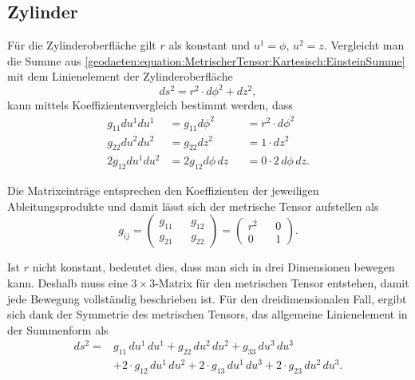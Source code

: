 %
%
%
%
\subsection{Zylinder\label{geodaeten:section:MetrischerTensor:Zylinder}}

Für die Zylinderoberfläche gilt $r$ als konstant und $u^1 = \phi$, $u^2 =z$.
Vergleicht man die Summe aus \eqref{geodaeten:equation:MetrischerTensor:Kartesisch:EinsteinSumme} mit dem Linienelement der Zylinderoberfläche
\begin{equation}
	ds^2 = r^2 \cdot d \phi^2 +dz^2 ,
\end{equation}
kann mittels Koeffizientenvergleich bestimmt werden, dass
\begin{equation}
	\begin{alignedat}{3}
		g_{11}  du^1 du^1 &= g_{11}  d \phi^2 & &= r^2 \cdot d \phi^2 \\
		g_{22}  du^2 du^2 &= g_{22}  dz^2    & &= 1 \cdot dz^2 \\
		2g_{12}  du^1 du^2 &= 2g_{12}  d \phi \, dz & &= 0 \cdot 2 \, d \phi \,  dz.
	\end{alignedat}
\end{equation}

Die Matrixeinträge entsprechen den Koeffizienten der jeweiligen Ableitungsprodukte und damit lässt sich der metrische Tensor aufstellen als
\begin{equation}
	g_{ij} =\begin{pmatrix} g_{11} && g_{12} \\ g_{21} && g_{22} \end{pmatrix}= \begin{pmatrix} r^2 && 0 \\ 0 && 1 \end{pmatrix} .
\end{equation}

Ist $r$ nicht konstant, bedeutet dies, dass man sich in drei Dimensionen bewegen kann.
Deshalb muss eine $3 \times 3$-Matrix für den metrischen Tensor entstehen, damit jede Bewegung vollständig beschrieben ist. 
Für den dreidimensionalen Fall, ergibt sich dank der Symmetrie des metrischen Tensors, das allgemeine Linienelement in der Summenform als
\begin{equation}
	\begin{aligned}
		ds^2 = &g_{11} \, du^1 \, du^1 + g_{22} \, du^2 \, du^2 + g_{33} \, du^3 \, du^3 \nonumber \\
		&+ 2 \cdot g_{12} \, du^1 \, du^2 + 2 \cdot g_{13} \, du^1 \, du^3 + 2 \cdot g_{23} \, du^2 \, du^3.
	\end{aligned}
	\label{geodaeten:equation:MetrischerTensor:Kartesisch:EinsteinSumme3D}
\end{equation}

